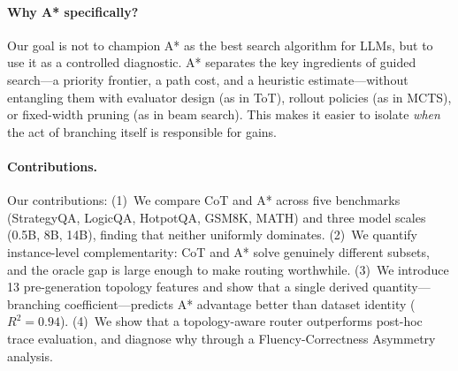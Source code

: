 \documentclass[11pt]{article}
\begin{document}


\paragraph{Why A* specifically?}
Our goal is not to champion A* as the best search algorithm for LLMs, but to use it as a controlled diagnostic. A* separates the key ingredients of guided search---a priority frontier, a path cost, and a heuristic estimate---without entangling them with evaluator design (as in ToT), rollout policies (as in MCTS), or fixed-width pruning (as in beam search). This makes it easier to isolate \emph{when} the act of branching itself is responsible for gains.

\paragraph{Contributions.}
Our contributions: (1)~We compare CoT and A* across five benchmarks (StrategyQA, LogicQA, HotpotQA, GSM8K, MATH) and three model scales (0.5B, 8B, 14B), finding that neither uniformly dominates. (2)~We quantify instance-level complementarity: CoT and A* solve genuinely different subsets, and the oracle gap is large enough to make routing worthwhile. (3)~We introduce 13 pre-generation topology features and show that a single derived quantity---branching coefficient---predicts A* advantage better than dataset identity ($R^2=0.94$). (4)~We show that a topology-aware router outperforms post-hoc trace evaluation, and diagnose why through a Fluency-Correctness Asymmetry analysis.



\end{document}
